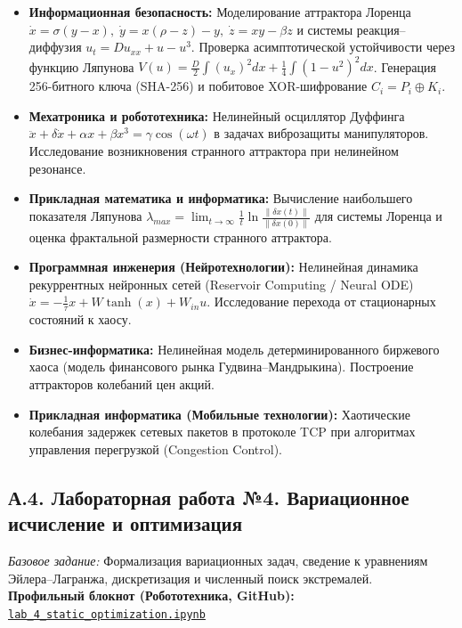 \documentclass[12pt]{article}
\begin{document}
\begin{itemize}[nosep]
    \item \textbf{Информационная безопасность:} Моделирование аттрактора Лоренца $\dot{x} = \sigma(y-x), \; \dot{y} = x(\rho-z)-y, \; \dot{z} = xy-\beta z$ и системы реакция--диффузия $u_t = D u_{xx} + u - u^3$. Проверка асимптотической устойчивости через функцию Ляпунова $V(u) = \frac{D}{2}\int (u_x)^2 dx + \frac{1}{4}\int (1-u^2)^2 dx$. Генерация 256-битного ключа (SHA-256) и побитовое XOR-шифрование $C_i = P_i \oplus K_i$.
    \item \textbf{Мехатроника и робототехника:} Нелинейный осциллятор Дуффинга $\ddot{x} + \delta \dot{x} + \alpha x + \beta x^3 = \gamma \cos(\omega t)$ в задачах виброзащиты манипуляторов. Исследование возникновения странного аттрактора при нелинейном резонансе.
    \item \textbf{Прикладная математика и информатика:} Вычисление наибольшего показателя Ляпунова $\lambda_{max} = \lim_{t\to\infty} \frac{1}{t}\ln\frac{\|\delta x(t)\|}{\|\delta x(0)\|}$ для системы Лоренца и оценка фрактальной размерности странного аттрактора.
    \item \textbf{Программная инженерия (Нейротехнологии):} Нелинейная динамика рекуррентных нейронных сетей (Reservoir Computing / Neural ODE) $\dot{x} = -\frac{1}{\tau}x + W \tanh(x) + W_{in}u$. Исследование перехода от стационарных состояний к хаосу.
    \item \textbf{Бизнес-информатика:} Нелинейная модель детерминированного биржевого хаоса (модель финансового рынка Гудвина--Мандрыкина). Построение аттракторов колебаний цен акций.
    \item \textbf{Прикладная информатика (Мобильные технологии):} Хаотические колебания задержек сетевых пакетов в протоколе TCP при алгоритмах управления перегрузкой (Congestion Control).
\end{itemize}

\subsection*{А.4. Лабораторная работа №4. Вариационное исчисление и оптимизация}\label{app:A4}
\textit{Базовое задание:} Формализация вариационных задач, сведение к уравнениям Эйлера--Лагранжа, дискретизация и численный поиск экстремалей.\\[0.2em]
\textbf{Профильный блокнот (Робототехника, GitHub):} \href{https://github.com/SikioN/dif-eq/blob/main/lab/lab_4_static_optimization.ipynb}{\texttt{lab\_4\_static\_optimization.ipynb}}
\end{document}
